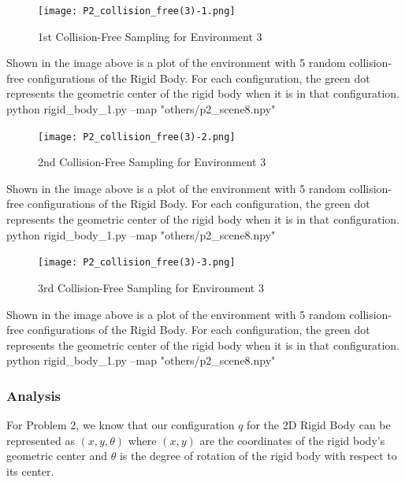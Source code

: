 \documentclass{article}
\begin{document}
\newpage 
\begin{figure}[h!]
	\texttt{[image: P2\_collision\_free(3)-1.png]}
	\centering
	\caption{1st Collision-Free Sampling for Environment 3}
	\label{P2_collision_free(3)-1.png}
\end{figure}
Shown in the image above is a plot of the environment with 5 random collision-free configurations of the Rigid Body. For each configuration, the green dot represents the geometric center of the rigid body when it is in that configuration. 
python rigid\_body\_1.py --map "others/p2\_scene8.npy"

\newpage 
\begin{figure}[h!]
	\texttt{[image: P2\_collision\_free(3)-2.png]}
	\centering
	\caption{2nd Collision-Free Sampling for Environment 3}
	\label{P2_collision_free(3)-2.png}
\end{figure}
Shown in the image above is a plot of the environment with 5 random collision-free configurations of the Rigid Body. For each configuration, the green dot represents the geometric center of the rigid body when it is in that configuration. 
python rigid\_body\_1.py --map "others/p2\_scene8.npy"

\newpage 
\begin{figure}[h!]
	\texttt{[image: P2\_collision\_free(3)-3.png]}
	\centering
	\caption{3rd Collision-Free Sampling for Environment 3}
	\label{P2_collision_free(3)-3.png}
\end{figure}
Shown in the image above is a plot of the environment with 5 random collision-free configurations of the Rigid Body. For each configuration, the green dot represents the geometric center of the rigid body when it is in that configuration. 
python rigid\_body\_1.py --map "others/p2\_scene8.npy"


\newpage 
\subsubsection{Analysis}
For Problem 2, we know that our configuration $q$ for the 2D Rigid Body can be represented as $(x, y, \theta)$ where $(x, y)$ are the coordinates of the rigid body's geometric center and $\theta$ is the degree of rotation of the rigid body with respect to its center. 
\end{document}

